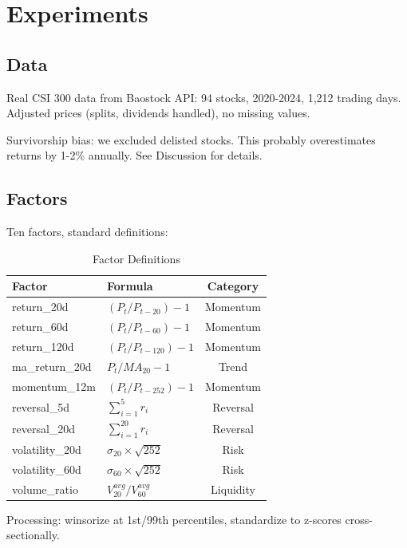 \section{Experiments}
\label{sec:experiments}

\subsection{Data}

Real CSI 300 data from Baostock API: 94 stocks, 2020-2024, 1,212 trading days. Adjusted prices (splits, dividends handled), no missing values.

Survivorship bias: we excluded delisted stocks. This probably overestimates returns by 1-2\% annually. See Discussion for details.

\subsection{Factors}

Ten factors, standard definitions:

\begin{table}[h]
\centering
\caption{Factor Definitions}
\begin{tabular}{llc}
\toprule
Factor & Formula & Category \\
\midrule
return\_20d & $(P_t / P_{t-20}) - 1$ & Momentum \\
return\_60d & $(P_t / P_{t-60}) - 1$ & Momentum \\
return\_120d & $(P_t / P_{t-120}) - 1$ & Momentum \\
ma\_return\_20d & $P_t / MA_{20} - 1$ & Trend \\
momentum\_12m & $(P_t / P_{t-252}) - 1$ & Momentum \\
\midrule
reversal\_5d & $\sum_{i=1}^{5} r_i$ & Reversal \\
reversal\_20d & $\sum_{i=1}^{20} r_i$ & Reversal \\
\midrule
volatility\_20d & $\sigma_{20} \times \sqrt{252}$ & Risk \\
volatility\_60d & $\sigma_{60} \times \sqrt{252}$ & Risk \\
\midrule
volume\_ratio & $V_{20}^{avg} / V_{60}^{avg}$ & Liquidity \\
\bottomrule
\end{tabular}
\end{table}

Processing: winsorize at 1st/99th percentiles, standardize to z-scores cross-sectionally.

